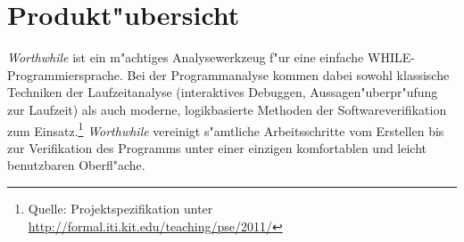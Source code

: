 \section{Produkt"ubersicht}%

\textit{Worthwhile} ist ein m"achtiges Analysewerkzeug f"ur eine einfache WHILE-Programmiersprache. Bei der Programmanalyse kommen dabei sowohl klassische Techniken der Laufzeitanalyse (interaktives Debuggen, Aussagen"uberpr"ufung zur Laufzeit) als auch moderne, logikbasierte Methoden der Softwareverifikation zum Einsatz.\footnote{Quelle: Projektspezifikation unter \url{http://formal.iti.kit.edu/teaching/pse/2011/}} \textit{Worthwhile} vereinigt s"amtliche Arbeitsschritte vom Erstellen bis zur Verifikation des Programms unter einer einzigen komfortablen und leicht benutzbaren Oberfl"ache.%
